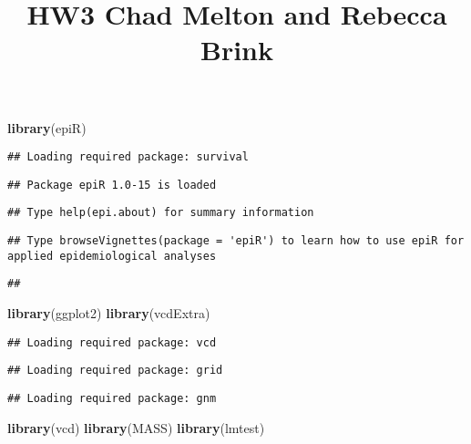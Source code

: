 \documentclass[
]{article}
\title{HW3 Chad Melton and Rebecca Brink}
\author{}
\date{\vspace{-2.5em}}
\newenvironment{Shaded}{\begin{snugshade}}{\end{snugshade}}
\newcommand{\KeywordTok}[1]{\textcolor[rgb]{0.13,0.29,0.53}{\textbf{#1}}}
\newcommand{\NormalTok}[1]{#1}
\begin{document}
\maketitle

\begin{Shaded}
\begin{Highlighting}[]
\KeywordTok{library}\NormalTok{(epiR)}
\end{Highlighting}
\end{Shaded}

\begin{verbatim}
## Loading required package: survival
\end{verbatim}

\begin{verbatim}
## Package epiR 1.0-15 is loaded
\end{verbatim}

\begin{verbatim}
## Type help(epi.about) for summary information
\end{verbatim}

\begin{verbatim}
## Type browseVignettes(package = 'epiR') to learn how to use epiR for applied epidemiological analyses
\end{verbatim}

\begin{verbatim}
## 
\end{verbatim}

\begin{Shaded}
\begin{Highlighting}[]
\KeywordTok{library}\NormalTok{(ggplot2)}
\KeywordTok{library}\NormalTok{(vcdExtra)}
\end{Highlighting}
\end{Shaded}

\begin{verbatim}
## Loading required package: vcd
\end{verbatim}

\begin{verbatim}
## Loading required package: grid
\end{verbatim}

\begin{verbatim}
## Loading required package: gnm
\end{verbatim}

\begin{Shaded}
\begin{Highlighting}[]
\KeywordTok{library}\NormalTok{(vcd)}
\KeywordTok{library}\NormalTok{(MASS)}
\KeywordTok{library}\NormalTok{(lmtest)}
\end{Highlighting}
\end{Shaded}
\end{document}
